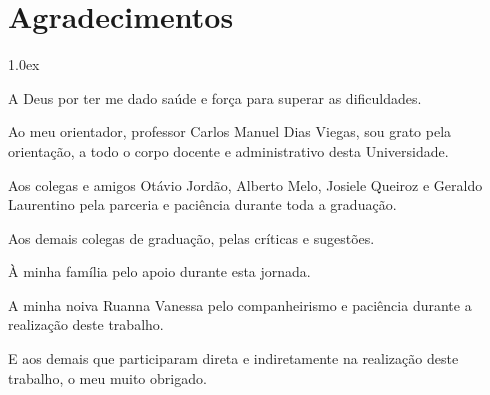 \chapter*{Agradecimentos}

\begin{trivlist}
\itemsep 1.0ex

	\item A Deus por ter me dado saúde e força para superar as dificuldades.
	
	\item Ao meu orientador, professor Carlos Manuel Dias Viegas, sou grato pela orientação, a todo o corpo docente e administrativo desta Universidade.
	
	\item Aos colegas e amigos Otávio Jordão, Alberto Melo, Josiele Queiroz e Geraldo Laurentino pela parceria e paciência durante toda a graduação.

	\item Aos demais colegas de graduação, pelas críticas e sugestões.
	
	\item À minha família pelo apoio durante esta jornada.
	
	\item A minha noiva Ruanna Vanessa pelo companheirismo e paciência durante a realização deste trabalho.
	
	\item E aos demais que participaram direta e indiretamente na realização deste trabalho, o meu muito obrigado.
\end{trivlist}

